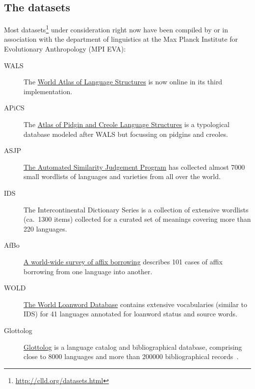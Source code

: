 \documentclass[a4paper,10pt]{article}
\begin{document}
\subsection{The datasets}
Most datasets\footnote{\url{http://clld.org/datasets.html}} under consideration right now have been compiled by or in association with the department of linguistics at the Max Planck Institute for Evolutionary Anthropology (MPI EVA):
\begin{description}
\item[WALS] The \href{http://wals.info}{World Atlas of Language Structures} is now online in its third implementation.
\item[APiCS] The \href{http://apics-online.info}{Atlas of Pidgin and Creole Language Structures} is a typological database modeled after WALS but focussing on pidgins and creoles.
\item[ASJP] \href{http://wwwstaff.eva.mpg.de/~wichmann/ASJPHomePage.htm}{The Automated Similarity Judgement Program} has collected almost 7000 small wordlists of languages and varieties from all over the world.
\item[IDS] The Intercontinental Dictionary Series is a collection of extensive wordlists (ca.~1300 items)
collected for a curated set of meanings covering more than 220 languages.
\item[AfBo] \href{http://afbo.info/}{A world-wide survey of affix borrowing} describes 101 cases of affix borrowing from one language into another.
\item[WOLD] \href{http://wold.livingsources.org}{The World Loanword Database} contains extensive vocabularies (similar to IDS) for 41 languages annotated for loanword status and source words.
\item[Glottolog] \href{http://glottolog.org}{Glottolog} is a language catalog and bibliographical database, comprising close to 8000 languages and more than 200000 bibliographical records~\cite{nordhoff2012}.
\end{description}
\end{document}
